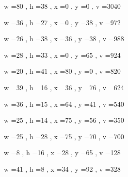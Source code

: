 \documentclass[11pt]{article}
\begin{document}
w =80 , h =38 , x =0 , y =0 , v =3040
\par
w =36 , h =27 , x =0 , y =38 , v =972
\par
w =26 , h =38 , x =36 , y =38 , v =988
\par
w =28 , h =33 , x =0 , y =65 , v =924
\par
w =20 , h =41 , x =80 , y =0 , v =820
\par
w =39 , h =16 , x =36 , y =76 , v =624
\par
w =36 , h =15 , x =64 , y =41 , v =540
\par
w =25 , h =14 , x =75 , y =56 , v =350
\par
w =25 , h =28 , x =75 , y =70 , v =700
\par
w =8 , h =16 , x =28 , y =65 , v =128
\par
w =41 , h =8 , x =34 , y =92 , v =328
\par
\newpage
\end{document}
